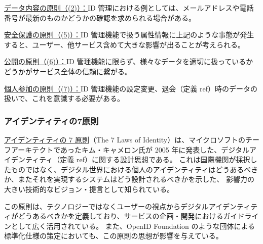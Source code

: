 \documentclass[uplatex]{jsarticle}
\def\ref#1{ref}%
\def\label#1{}%
\begin{document}
\begin{rem}\label{rem:ch5-oecd-in-idm}
\underline{データ内容の原則（(2)）：}ID 管理における例としては、メールアドレスや電話番号が最新のものかどうかの確認を求められる場合がある。

\underline{安全保護の原則（(5)）：}ID 管理機能で扱う属性情報に上記のような事態が発生すると、ユーザー、他サービス含めて大きな影響が出ることが考えられる。

\underline{公開の原則（(6)）：}ID 管理機能に限らず、様々なデータを適切に扱っているかどうかがサービス全体の信頼に繋がる。

\underline{個人参加の原則（(7)）：}ID 管理機能の設定変更、退会（定義 \ref{dfn:account-deletion}）時のデータの扱いで、これを意識する必要がある。
\end{rem}

\subsubsection{アイデンティティの7原則}

\underline{アイデンティティの 7 原則}（The 7 Laws of Identity）は、マイクロソフトのチーフアーキテクトであったキム・キャメロン氏が 2005 年に発表した、デジタルアイデンティティ（定義 \ref{dfn:digital-identity}）に関する設計思想である。
これは国際機関が採択したものではなく、デジタル世界における個人のアイデンティティはどうあるべきか、またそれを実現するシステムはどう設計されるべきかを示した、
影響力の大きい技術的なビジョン・提言として知られている。

この原則は、テクノロジーではなくユーザーの視点からデジタルアイデンティティがどうあるべきかを定義しており、サービスの企画・開発におけるガイドラインとして広く活用されている。
また、OpenID Foundation のような団体による標準化仕様の策定においても、この原則の思想が影響を与えている。
\end{document}

